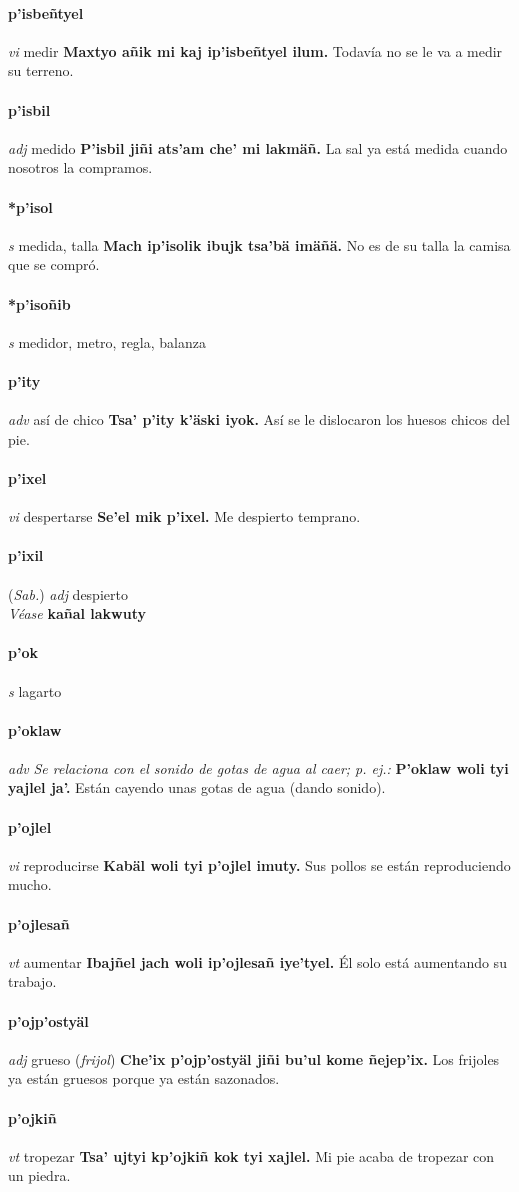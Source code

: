 \documentclass{scrbook}
\newcommand{\entry}[1]{\paragraph{#1}}
\newcommand{\nontranslationdef}[1]{\textit{#1}}
\newcommand{\partofspeech}[1]{\textit{#1}}
\newcommand{\spanishtranslation}[1]{#1}
\newcommand{\clarification}[1]{(\textit{#1})}
\newcommand{\cholexample}[1]{\textbf{#1}}
\newcommand{\exampletranslation}[1]{#1}
\newcommand{\alsosee}[1]{\\\textit{Véase} \textbf{#1}}
\newcommand{\relevantdialect}[1]{(\textit{#1})}
\begin{document}
\begin{multicols}{2}
\entry{p'isbeñtyel}
\partofspeech{vi}
\spanishtranslation{medir}
\cholexample{Maxtyo añik mi kaj ip'isbeñtyel ilum.}
\exampletranslation{Todavía no se le va a medir su terreno.}

\entry{p'isbil}
\partofspeech{adj}
\spanishtranslation{medido}
\cholexample{P'isbil jiñi ats'am che' mi lakmäñ.}
\exampletranslation{La sal ya está medida cuando nosotros la compramos.}

\entry{*p'isol}
\partofspeech{s}
\spanishtranslation{medida, talla}
\cholexample{Mach ip'isolik ibujk tsa'bä imäñä.}
\exampletranslation{No es de su talla la camisa que se compró.}

\entry{*p'isoñib}
\partofspeech{s}
\spanishtranslation{medidor, metro, regla, balanza}

\entry{p'ity}
\partofspeech{adv}
\spanishtranslation{así de chico}
\cholexample{Tsa' p'ity k'äski iyok.}
\exampletranslation{Así se le dislocaron los huesos chicos del pie.}

\entry{p'ixel}
\partofspeech{vi}
\spanishtranslation{despertarse}
\cholexample{Se'el mik p'ixel.}
\exampletranslation{Me despierto temprano.}

\entry{p'ixil}
\relevantdialect{Sab.}
\partofspeech{adj}
\spanishtranslation{despierto}
\alsosee{kañal lakwuty}

\entry{p'ok}
\partofspeech{s}
\spanishtranslation{lagarto}

\entry{p'oklaw}
\partofspeech{adv}
\nontranslationdef{Se relaciona con el sonido de gotas de agua al caer; p. ej.:}
\cholexample{P'oklaw woli tyi yajlel ja'.}
\exampletranslation{Están cayendo unas gotas de agua (dando sonido).}

\entry{p'ojlel}
\partofspeech{vi}
\spanishtranslation{reproducirse}
\cholexample{Kabäl woli tyi p'ojlel imuty.}
\exampletranslation{Sus pollos se están reproduciendo mucho.}

\entry{p'ojlesañ}
\partofspeech{vt}
\spanishtranslation{aumentar}
\cholexample{Ibajñel jach woli ip'ojlesañ iye'tyel.}
\exampletranslation{Él solo está aumentando su trabajo.}

\entry{p'ojp'ostyäl}
\partofspeech{adj}
\spanishtranslation{grueso}
\clarification{frijol}
\cholexample{Che'ix p'ojp'ostyäl jiñi bu'ul kome ñejep'ix.}
\exampletranslation{Los frijoles ya están gruesos porque ya están sazonados.}

\entry{p'ojkiñ}
\partofspeech{vt}
\spanishtranslation{tropezar}
\cholexample{Tsa' ujtyi kp'ojkiñ kok tyi xajlel.}
\exampletranslation{Mi pie acaba de tropezar con un piedra.}


\end{multicols}
\end{document}
